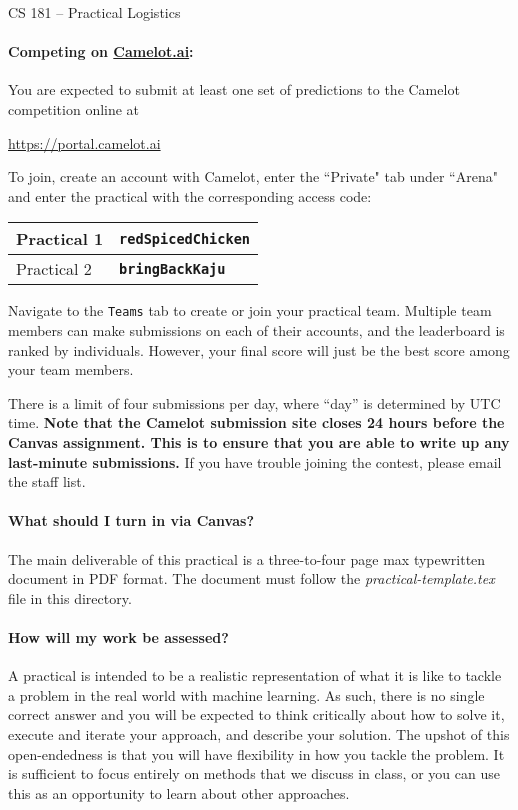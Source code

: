 \documentclass[12pt,letterpaper]{article}
\begin{document}
\begin{center}
  {\large CS 181 -- Practical Logistics}
\end{center}


\paragraph{Competing on \href{https://camelot.ai}{Camelot.ai}:} You are expected to submit at least one set of predictions to the Camelot competition online at
	\begin{center}
		\href{https://portal.camelot.ai}{https://portal.camelot.ai}
	\end{center}

	To join, create an account with Camelot, enter the ``Private" tab under ``Arena" and enter the practical with the corresponding access code:

\begin{center}
\begin{tabular}{l|l}
Practical 1 & \textbf{\texttt{redSpicedChicken}}\\
\hline
Practical 2 & \textbf{\texttt{bringBackKaju}}
\end{tabular}
\end{center}

Navigate to the \texttt{Teams} tab to create or join your practical team. Multiple team members can make submissions on each of their accounts, and the leaderboard is ranked by individuals. However, your final score will just be the best score among your team members. 

There is a limit of four submissions per day, where ``day'' is determined by UTC time.  \textbf{Note that the Camelot submission site closes 24 hours before the Canvas assignment.  This is to ensure that you are able to write up any last-minute submissions.} If you have trouble joining the contest, please email the staff list.



\paragraph{What should I turn in via Canvas?}

The main deliverable of this practical is a three-to-four page max
typewritten document in PDF format.  The document must follow the
\textit{practical-template.tex} file in this directory.

\paragraph{How will my work be assessed?}
A practical is intended to be a realistic representation of what it
is like to tackle a problem in the real world with machine learning.
As such, there is no single correct answer and you will be expected to
think critically about how to solve it, execute and iterate your
approach, and describe your solution.  The upshot of this
open-endedness is that you will have flexibility in how you tackle the
problem.  It is sufficient to focus entirely on methods that we
discuss in class, or you can use this as an opportunity to learn about
other approaches.
\end{document}
